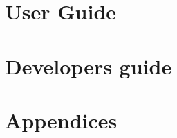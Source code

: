 \documentclass[10pt,letter, twopage headsepline]{book}
\begin{document}
  
  

  \part{User Guide}
    
    
    
    
    
    
    
    
    
    
    

  \part{Developers guide}
    
    

  \part{Appendices}
    \appendix
    
    

    \cleardoublepage
    
    

    \cleardoublepage
    \printindex
\end{document}
